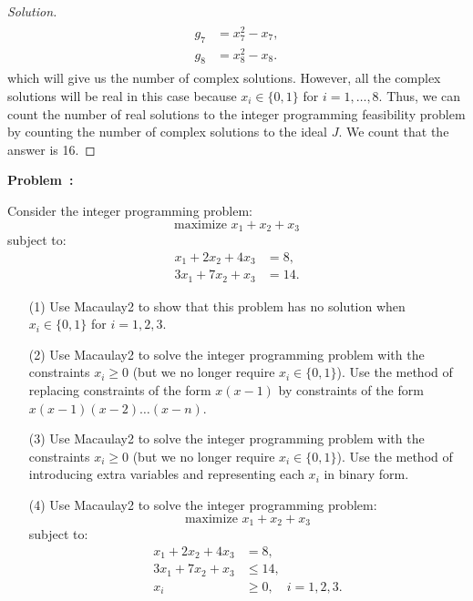 \documentclass[12pt]{article}
\newcounter{problem}
\newenvironment{problem}[1][Problem]{%
	\refstepcounter{problem}%
	\noindent\textbf{\color{magenta}#1~\theproblem: }%
}{}
\newenvironment{solution}
    {\renewcommand{\qedsymbol}{}\begin{proof}[Solution]}
    {\end{proof}}
\begin{document}
\begin{solution}
\begin{align*}
\begin{aligned}
			                                                                                    g_7 & = x_7^2 - x_7,                      \\
			                                                                                    g_8 & = x_8^2 - x_8.
		                                                                                    \end{aligned}
	\end{align*}
	which will give us the number of complex solutions. However, all the complex solutions will be real in this case because $x_i \in \{0, 1\}$ for $i = 1, \dots, 8$. Thus, we can count the number of real solutions to the integer programming feasibility problem by counting the number of complex solutions to the ideal $J$. We count that the answer is 16.
\end{solution}

\begin{problem}
Consider the integer programming problem:
\[
	\text{maximize } x_1 + x_2 + x_3
\]
subject to:
\[
	\begin{aligned}
		x_1 + 2x_2 + 4x_3 & = 8,  \\
		3x_1 + 7x_2 + x_3 & = 14.
	\end{aligned}
\]

\begin{enumerate}
	\item[(1)] Use Macaulay2 to show that this problem has no solution when \( x_i \in \{0, 1\} \) for \( i = 1, 2, 3 \).
	\item[(2)] Use Macaulay2 to solve the integer programming problem with the constraints \( x_i \geq 0 \) (but we no longer require \( x_i \in \{0, 1\} \)). Use the method of replacing constraints of the form \( x(x - 1) \) by constraints of the form \( x(x - 1)(x - 2) \dots (x - n) \).
	\item[(3)] Use Macaulay2 to solve the integer programming problem with the constraints \( x_i \geq 0 \) (but we no longer require \( x_i \in \{0, 1\} \)). Use the method of introducing extra variables and representing each \( x_i \) in binary form.
	\item[(4)] Use Macaulay2 to solve the integer programming problem:
	      \[
		      \text{maximize } x_1 + x_2 + x_3
	      \]
	      subject to:
	      \[
		      \begin{aligned}
			      x_1 + 2x_2 + 4x_3 & = 8,                       \\
			      3x_1 + 7x_2 + x_3 & \leq 14,                   \\
			      x_i               & \geq 0, \quad i = 1, 2, 3.
		      \end{aligned}
	      \]
\end{enumerate}
\end{problem}
\end{document}
